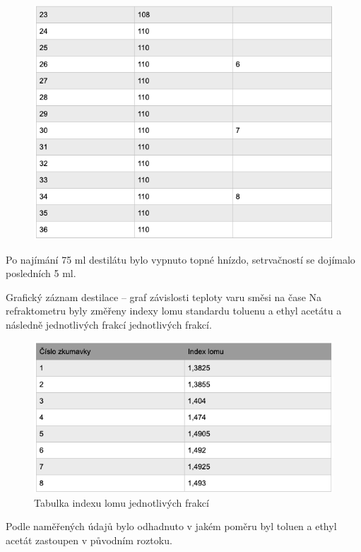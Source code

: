 \documentclass[13pt, a4paper, twoside]{article}
\begin{document}
\begin{figure}[H]
    \centering
    \includegraphics[width=6.5in]{uloha_8_tab_2.png}
\end{figure}

Po najímání 75 ml destilátu bylo vypnuto topné hnízdo, setrvačností se dojímalo posledních 5 ml.

Grafický záznam destilace – graf závislosti teploty varu směsi na čase
Na refraktometru byly změřeny indexy lomu standardu toluenu a ethyl acetátu a následně jednotlivých frakcí jednotlivých frakcí.

\begin{figure}[H]
    \centering
    \includegraphics[width=6.5in]{uloha_8_tab_3.png}
    \caption*{Tabulka indexu lomu jednotlivých frakcí}
\end{figure}

Podle naměřených údajů bylo odhadnuto v jakém poměru byl toluen a ethyl acetát zastoupen v původním roztoku.
\end{document}
